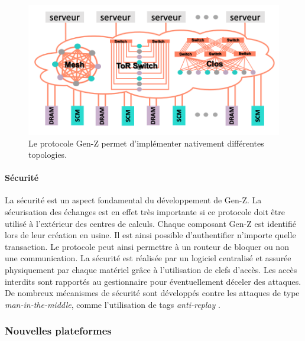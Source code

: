                 \begin{figure}
                \center
                \includegraphics[width=14cm]{images/edl_genz_topo.png}
                \caption{\label{fig:edl_genz_topo} Le protocole Gen-Z permet d'implémenter nativement différentes topologies.}
            \end{figure}
            
            

    \paragraph{Sécurité}

        La sécurité est un aspect fondamental du développement de Gen-Z. La sécurisation des échanges est en effet très importante si ce protocole doit être utilisé à l'extérieur des centres de calculs. Chaque composant Gen-Z est identifié lors de leur création en usine. Il est ainsi possible d'authentifier n'importe quelle transaction. Le protocole peut ainsi permettre à un routeur de bloquer ou non une communication. La sécurité est réalisée par un logiciel centralisé et assurée physiquement par chaque matériel grâce à l’utilisation de clefs d’accès. Les accès interdits sont rapportés au gestionnaire pour éventuellement déceler des attaques. De nombreux mécanismes de sécurité sont développés contre les attaques de type \textit{man-in-the-middle}, comme l'utilisation de tags \textit{anti-replay} \cite{Radhakishan2011}.

    \subsubsection{Nouvelles plateformes} \label{sec:oppo_new_tech} \label{sec:compute_on_the_edge}
            
